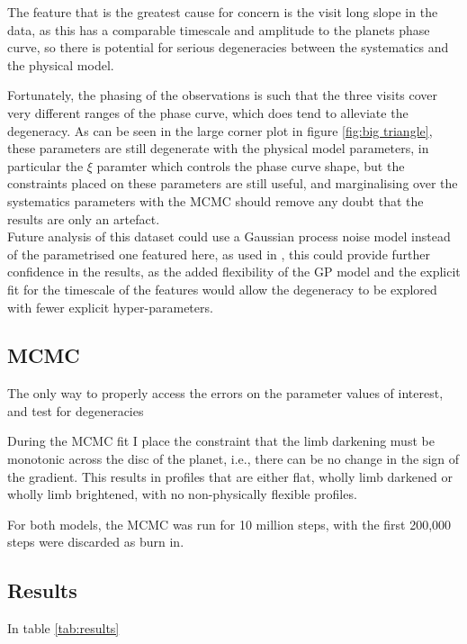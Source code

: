 \documentclass[a4paper,fleqn,usenatbib]{mnras}
\begin{document}
The feature that is the greatest cause for concern is the visit long slope in the data, as this has a comparable timescale and amplitude to the planets phase curve, so there is potential for serious degeneracies between the systematics and the physical model.

Fortunately, the phasing of the observations is such that the three visits cover very different ranges of the phase curve, which does tend to alleviate the degeneracy. As can be seen in the large corner plot in figure \ref{fig:big triangle}, these parameters are still degenerate with the physical model parameters, in particular the $\xi$ paramter which controls the phase curve shape, but the constraints placed on these parameters are still useful, and marginalising over the systematics parameters with the MCMC should remove any doubt that the results are only an artefact.\\

Future analysis of this dataset could use a Gaussian process noise model instead of the parametrised one featured here, as used in \citet{Gibson2012a}, this could provide further confidence in the results, as the added flexibility of the GP model and the explicit fit for the timescale of the features would allow the degeneracy to be explored with fewer explicit hyper-parameters.

\subsection{MCMC}\label{sec:MCMC}

The only way to properly access the errors on the parameter values of interest, and test for degeneracies

During the MCMC fit I place the constraint that the limb darkening must be monotonic across the disc of the planet, i.e., there can be no change in the sign of the gradient. This results in profiles that are either flat, wholly limb darkened or wholly limb brightened, with no non-physically flexible profiles.

For both models, the MCMC was run for 10 million steps, with the first 200,000 steps were discarded as burn in.

\subsection{Results}\label{sec:results}

In table \ref{tab:results}
\end{document}
